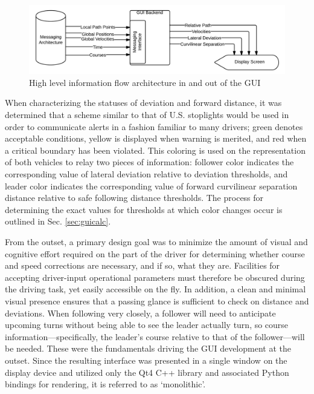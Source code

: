 \begin{figure}[ht] \centering 
    \includegraphics[width=6.5in]{./figs/blackbox_flowchart.png}
    \caption{High level information flow architecture in and out of the GUI} \label{fig:blackboxflow}
\end{figure}

When characterizing the statuses of deviation and forward distance, it was determined that a scheme similar to that of U.S. stoplights would be used in order to communicate alerts in a fashion familiar to many drivers; green denotes acceptable conditions, yellow is displayed when warning is merited, and red when a critical boundary has been violated. This coloring is used on the representation of both vehicles to relay two pieces of information: follower color indicates the corresponding value of lateral deviation relative to deviation thresholds, and leader color indicates the corresponding value of forward curvilinear separation distance relative to safe following distance thresholds. The process for determining the exact values for thresholds at which color changes occur is outlined in Sec. \ref{sec:guicalc}.

From the outset, a primary design goal was to minimize the amount of visual and cognitive effort required on the part of the driver for determining whether course and speed corrections are necessary, and if so, what they are. Facilities for accepting driver-input operational parameters must therefore be obscured during the driving task, yet easily accessible on the fly. In addition, a clean and minimal visual presence ensures that a passing glance is sufficient to check on distance and deviations. When following very closely, a follower will need to anticipate upcoming turns without being able to see the leader actually turn, so course information---specifically, the leader's course relative to that of the follower---will be needed.  These were the fundamentals driving the GUI development at the outset. Since the resulting interface was presented in a single window on the display device and utilized only the Qt4 C++ library and associated Python bindings for rendering, it is referred to as `monolithic'.


